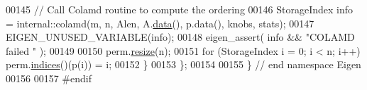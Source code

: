 \begin{DoxyCode}
00145       \textcolor{comment}{// Call Colamd routine to compute the ordering }
00146       StorageIndex info = internal::colamd(m, n, Alen, A.\hyperlink{class_eigen_1_1_plain_object_base_ac25699535374b1854cf8494e44ad31b2}{data}(), p.data(), knobs, stats); 
00147       EIGEN\_UNUSED\_VARIABLE(info);
00148       eigen\_assert( info && \textcolor{stringliteral}{"COLAMD failed "} );
00149       
00150       perm.\hyperlink{group___core___module_a0e0fda6e84d69e02432e4770359bb532}{resize}(n);
00151       \textcolor{keywordflow}{for} (StorageIndex i = 0; i < n; i++) perm.\hyperlink{group___core___module_a2f1ab379207fcd1ceb33941e25cf50c2}{indices}()(p(i)) = i;
00152     \}
00153 \};
00154 
00155 \} \textcolor{comment}{// end namespace Eigen}
00156 
00157 \textcolor{preprocessor}{#endif}
\end{DoxyCode}
